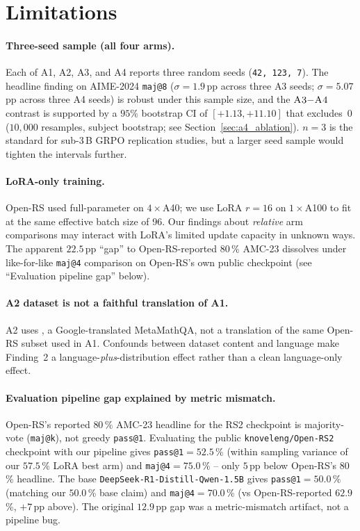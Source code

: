 \documentclass[11pt]{article}
\newcommand{\armA}{\textsc{A1}}
\newcommand{\armB}{\textsc{A2}}
\newcommand{\armC}{\textsc{A3}}
\newcommand{\armD}{\textsc{A4}}
\begin{document}
\section{Limitations}
\label{sec:limitations}

\paragraph{Three-seed sample (all four arms).}
Each of \armA{}, \armB{}, \armC{}, and \armD{} reports three random
seeds (\texttt{42, 123, 7}). The headline finding on AIME-2024
\texttt{maj@8} ($\sigma{=}1.9$\,pp across three \armC{} seeds;
$\sigma{=}5.07$\,pp across three \armD{} seeds) is robust under this
sample size, and the $\armC{}{-}\armD{}$ contrast is supported by a
$95\%$ bootstrap CI of $[+1.13, +11.10]$ that excludes~$0$ ($10{,}000$
resamples, subject bootstrap; see Section~\ref{sec:a4_ablation}). $n{=}3$
is the standard for sub-3\,B GRPO replication studies, but a larger
seed sample would tighten the intervals further.

\paragraph{LoRA-only training.}
Open-RS used full-parameter on $4\times$A40; we use LoRA $r{=}16$ on
$1\times$A100 to fit at the same effective batch size of 96. Our
findings about \emph{relative} arm comparisons may interact with LoRA's
limited update capacity in unknown ways. The apparent $22.5$\,pp
``gap'' to Open-RS-reported $80$\,\% AMC-23 dissolves under
like-for-like \texttt{maj@4} comparison on Open-RS's own public
checkpoint (see ``Evaluation pipeline gap'' below).

\paragraph{\armB{} dataset is not a faithful translation of \armA{}.}
\armB{} uses , a
Google-translated MetaMathQA, not a translation of the same Open-RS
subset used in \armA{}. Confounds between dataset content and
language make Finding~2 a language-\emph{plus}-distribution effect
rather than a clean language-only effect.

\paragraph{Evaluation pipeline gap explained by metric mismatch.}
Open-RS's reported $80$\,\% AMC-23 headline for the RS2 checkpoint is
majority-vote (\texttt{maj@k}), not greedy \texttt{pass@1}. Evaluating
the public \texttt{knoveleng/Open-RS2} checkpoint with our pipeline
gives \texttt{pass@1}$=52.5$\,\% (within sampling variance of our
$57.5$\,\% LoRA best arm) and \texttt{maj@4}$=75.0$\,\% -- only
$5$\,pp below Open-RS's $80$\,\% headline. The base
\texttt{DeepSeek-R1-Distill-Qwen-1.5B} gives \texttt{pass@1}$=50.0$\,\%
(matching our $50.0$\,\% base claim) and \texttt{maj@4}$=70.0$\,\%
(vs Open-RS-reported $62.9$\,\%, $+7$\,pp above). The original
$12.9$\,pp gap was a metric-mismatch artifact, not a pipeline bug.
\end{document}

